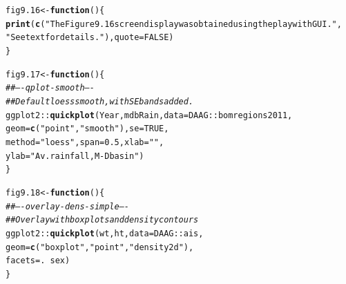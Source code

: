 \documentclass[12pt, a4paper,  BCOR=8.25mm, DIV=15]{scrartcl}\usepackage[]{graphicx}\usepackage[]{color}
\makeatletter
\newcommand{\hlnum}[1]{\textcolor[rgb]{0.686,0.059,0.569}{#1}}%
\newcommand{\hlstr}[1]{\textcolor[rgb]{0.192,0.494,0.8}{#1}}%
\newcommand{\hlcom}[1]{\textcolor[rgb]{0.678,0.584,0.686}{\textit{#1}}}%
\newcommand{\hlopt}[1]{\textcolor[rgb]{0,0,0}{#1}}%
\newcommand{\hlstd}[1]{\textcolor[rgb]{0.345,0.345,0.345}{#1}}%
\newcommand{\hlkwa}[1]{\textcolor[rgb]{0.161,0.373,0.58}{\textbf{#1}}}%
\newcommand{\hlkwb}[1]{\textcolor[rgb]{0.69,0.353,0.396}{#1}}%
\newcommand{\hlkwc}[1]{\textcolor[rgb]{0.333,0.667,0.333}{#1}}%
\newcommand{\hlkwd}[1]{\textcolor[rgb]{0.737,0.353,0.396}{\textbf{#1}}}%
\newenvironment{kframe}{%
 \def\at@end@of@kframe{}%
 \ifinner\ifhmode%
  \def\at@end@of@kframe{\end{minipage}}%
  \begin{minipage}{\columnwidth}%
 \fi\fi%
 \def\FrameCommand##1{\hskip\@totalleftmargin \hskip-\fboxsep
 \colorbox{shadecolor}{##1}\hskip-\fboxsep
     \hskip-\linewidth \hskip-\@totalleftmargin \hskip\columnwidth}%
 \MakeFramed {\advance\hsize-\width
   \@totalleftmargin\z@ \linewidth\hsize
   \@setminipage}}%
 {\par\unskip\endMakeFramed%
 \at@end@of@kframe}
\newenvironment{knitrout}{}{} %
\makeatother
\begin{document}
\begin{knitrout}
\color{fgcolor}\begin{kframe}
\begin{alltt}
\hlstd{fig9.16} \hlkwb{<-} \hlkwa{function}\hlstd{()\{}
\hlkwd{print}\hlstd{(}\hlkwd{c}\hlstd{(}\hlstr{"The Figure 9.16 screen display was obtained using the playwith GUI."}\hlstd{,}
        \hlstr{"See text for details."}\hlstd{),} \hlkwc{quote}\hlstd{=}\hlnum{FALSE}\hlstd{)}
\hlstd{\}}
\end{alltt}
\end{kframe}
\end{knitrout}

\begin{knitrout}
\color{fgcolor}\begin{kframe}
\begin{alltt}
\hlstd{fig9.17} \hlkwb{<-} \hlkwa{function}\hlstd{()\{}
\hlcom{## ---- qplot-smooth ----}
\hlcom{## Default loess smooth, with SE bands added.}
\hlstd{ggplot2}\hlopt{::}\hlkwd{quickplot}\hlstd{(Year, mdbRain,} \hlkwc{data}\hlstd{=DAAG}\hlopt{::}\hlstd{bomregions2011,}
          \hlkwc{geom}\hlstd{=}\hlkwd{c}\hlstd{(}\hlstr{"point"}\hlstd{,}\hlstr{"smooth"}\hlstd{),} \hlkwc{se}\hlstd{=}\hlnum{TRUE}\hlstd{,}
          \hlkwc{method}\hlstd{=}\hlstr{"loess"}\hlstd{,} \hlkwc{span}\hlstd{=}\hlnum{0.5}\hlstd{,} \hlkwc{xlab}\hlstd{=}\hlstr{""}\hlstd{,}
          \hlkwc{ylab}\hlstd{=}\hlstr{"Av. rainfall, M-D basin"}\hlstd{)}
\hlstd{\}}
\end{alltt}
\end{kframe}
\end{knitrout}

\begin{knitrout}
\color{fgcolor}\begin{kframe}
\begin{alltt}
\hlstd{fig9.18} \hlkwb{<-} \hlkwa{function}\hlstd{()\{}
\hlcom{## ---- overlay-dens-simple ----}
\hlcom{## Overlay with boxplots and density contours}
\hlstd{ggplot2}\hlopt{::}\hlkwd{quickplot}\hlstd{(wt, ht,} \hlkwc{data}\hlstd{=DAAG}\hlopt{::}\hlstd{ais,}
          \hlkwc{geom}\hlstd{=}\hlkwd{c}\hlstd{(}\hlstr{"boxplot"}\hlstd{,} \hlstr{"point"}\hlstd{,} \hlstr{"density2d"}\hlstd{),}
          \hlkwc{facets} \hlstd{= .} \hlopt{~} \hlstd{sex)}
\hlstd{\}}
\end{alltt}
\end{kframe}
\end{knitrout}
\end{document}
